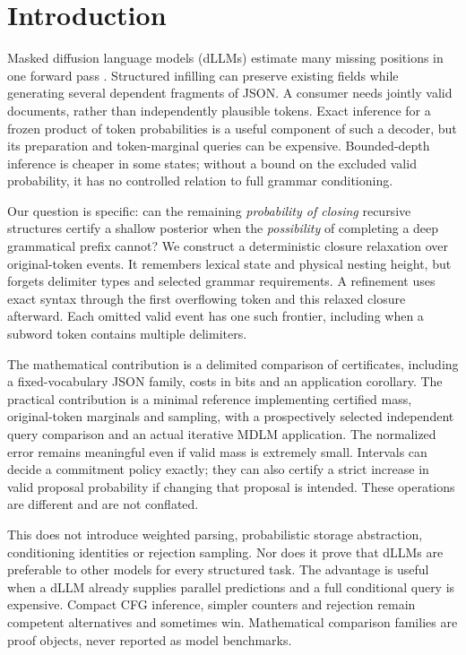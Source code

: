 \documentclass[12pt]{article}
\theoremstyle{readable}
\begin{document}
\section{Introduction}

Masked diffusion language models (dLLMs) estimate many missing positions in
one forward pass \cite{sahoo2024mdlm,nie2025llada}. Structured infilling can
preserve existing fields while generating several dependent fragments of JSON.
A consumer needs jointly valid documents, rather than independently plausible
tokens. Exact inference for a frozen product of token probabilities is a useful
component of such a decoder, but its preparation and token-marginal queries
can be expensive. Bounded-depth inference is cheaper in some states; without
a bound on the excluded valid probability, it has no controlled relation to
full grammar conditioning.

Our question is specific: can the remaining \emph{probability of closing}
recursive structures certify a shallow posterior when the \emph{possibility}
of completing a deep grammatical prefix cannot? We construct a deterministic
closure relaxation over original-token events. It remembers lexical state and
physical nesting height, but forgets delimiter types and selected grammar
requirements. A refinement uses exact syntax through the first overflowing
token and this relaxed closure afterward. Each omitted valid event has one
such frontier, including when a subword token contains multiple delimiters.

The mathematical contribution is a delimited comparison of certificates,
including a fixed-vocabulary JSON family, costs in bits and an application
corollary. The practical contribution is a minimal reference implementing
certified mass, original-token marginals and sampling, with a prospectively
selected independent query comparison and an actual iterative MDLM application.
The normalized error remains meaningful even if valid mass is extremely small.
Intervals can decide a commitment policy exactly; they can also certify a
strict increase in valid proposal probability if changing that proposal is
intended. These operations are different and are not conflated.

This does not introduce weighted parsing, probabilistic storage abstraction,
conditioning identities or rejection sampling. Nor does it prove that dLLMs
are preferable to other models for every structured task. The advantage is
useful when a dLLM already supplies parallel predictions and a full conditional
query is expensive. Compact CFG inference, simpler counters and rejection
remain competent alternatives and sometimes win. Mathematical comparison
families are proof objects, never reported as model benchmarks.
\end{document}
